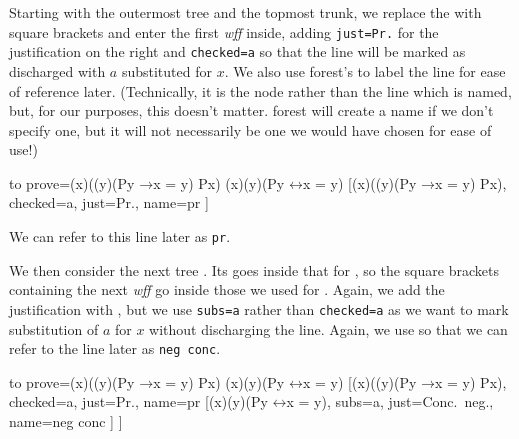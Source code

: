 \documentclass[10pt,british,a4paper,doc2]{ltxdoc}
\newcommand*\pkg[1]{\textsf{#1}}
\newcommand*{\lif}{\ensuremath{\mathbin{\rightarrow}}}
\newcommand*{\liff}{\ensuremath{\mathbin{\leftrightarrow}}}
\newcommand*\wff{\emph{wff}}
\begin{document}
Starting with the outermost tree \nyth*{} and the topmost trunk, we replace the \bocsnyth{} with square brackets and enter the first \wff{} inside, adding \verb|just=Pr.| for the justification on the right and \verb|checked=a| so that the line will be marked as discharged with $a$ substituted for $x$.
We also use \pkg{forest}'s  to label the line for ease of reference later.
(Technically, it is the node rather than the line which is named, but, for our purposes, this doesn't matter.
\pkg{forest} will create a name if we don't specify one, but it will not necessarily be one we would have chosen for ease of use!)
\begin{latexcode}
\begin{tableau}
  {
    to prove={(\exists x)((\forall y)(Py \lif x = y) \land Px) \sststile{}{} (\exists x)(\forall y)(Py \liff x = y)}
  }
  [{(\exists x)((\forall y)(Py \lif x = y) \land Px)}, checked=a, just=Pr., name=pr
  ]
\end{tableau}
\end{latexcode}
We can refer to this line later as \verb|pr|.

We then consider the next tree \nyth*{}.
Its \bocsnyth{} goes inside that for \nyth[1], so the square brackets containing the next \wff{} go inside those we used for \nyth[1].
Again, we add the justification with , but we use \verb|subs=a| rather than \verb|checked=a| as we want to mark substitution of $a$ for $x$ without discharging the line.
Again, we use  so that we can refer to the line later as \verb|neg conc|.
\begin{latexcode}
\begin{tableau}
  {
    to prove={(\exists x)((\forall y)(Py \lif x = y) \land Px) \sststile{}{} (\exists x)(\forall y)(Py \liff x = y)}
  }
  [{(\exists x)((\forall y)(Py \lif x = y) \land Px)}, checked=a, just=Pr., name=pr
    [{\lnot (\exists x)(\forall y)(Py \liff x = y)}, subs=a, just=Conc.~neg., name=neg conc
    ]
  ]
\end{tableau}
\end{latexcode}
\end{document}
